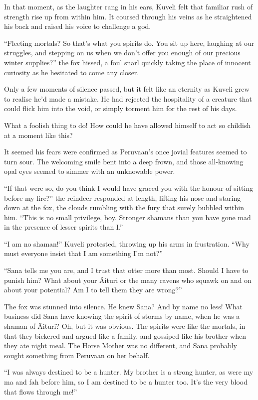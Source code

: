 In that moment, as the laughter rang in his ears, Kuveli felt that familiar rush of strength rise up from within him. It coursed through his veins as he straightened his back and raised his voice to challenge a god.

``Fleeting mortals? So that's what you spirits do. You sit up here, laughing at our struggles, and stepping on us when we don't offer you enough of our precious winter supplies?'' the fox hissed, a foul snarl quickly taking the place of innocent curiosity as he hesitated to come any closer.

Only a few moments of silence passed, but it felt like an eternity as Kuveli grew to realise he'd made a mistake. He had rejected the hospitality of a creature that could flick him into the void, or simply torment him for the rest of his days.

What a foolish thing to do! How could he have allowed himself to act so childish at a moment like this?

It seemed his fears were confirmed as Peruvaan's once jovial features seemed to turn sour. The welcoming smile bent into a deep frown, and those all-knowing opal eyes seemed to simmer with an unknowable power.

``If that were so, do you think I would have graced you with the honour of sitting before my fire?'' the reindeer responded at length, lifting his nose and staring down at the fox, the clouds rumbling with the fury that surely bubbled within him. ``This is no small privilege, boy. Stronger shamans than you have gone mad in the presence of lesser spirits than I.''

``I am no shaman!'' Kuveli protested, throwing up his arms in frustration. ``Why must everyone insist that I am something I'm not?''

``Sana tells me you are, and I trust that otter more than most. Should I have to punish him? What about your Äituri or the many ravens who squawk on and on about your potential? Am I to tell them they are wrong?''

The fox was stunned into silence. He knew Sana? And by name no less! What business did Sana have knowing the spirit of storms by name, when he was a shaman of Äituri? Oh, but it was obvious. The spirits were like the mortals, in that they bickered and argued like a family, and gossiped like his brother when they ate night meal. The Horse Mother was no different, and Sana probably sought something from Peruvaan on her behalf.

``I was always destined to be a hunter. My brother is a strong hunter, as were my ma and fah before him, so I am destined to be a hunter too. It's the very blood that flows through me!''

